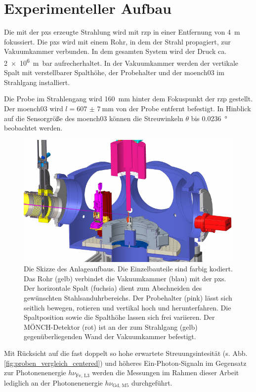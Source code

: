 \chapter{Experimenteller Aufbau}
Die mit der \gls{pxs} erzeugte Strahlung wird mit \gls{rzp} in einer Entfernung von \SI{4}{\meter} fokussiert. Die \gls{pxs} wird mit einem Rohr, in dem der Strahl propagiert, zur Vakuumkammer verbunden. In dem gesamten System wird der Druck ca. \SI{2e6}{\meter\bar} aufrecherhaltet. In der Vakuumkammer werden der vertikale Spalt mit verstellbarer Spalthöhe, der Probehalter und der \gls{moench03} im Strahlgang installiert.

\noindent
Die Probe im Strahlengang wird \SI{160}{\milli\meter} hinter dem Fokuspunkt der \gls{rzp} gestellt. Der \gls{moench03} wird $l = \SI{607(7)}{\milli\meter}$ von der Probe entfernt befestigt. In Hinblick auf die Sensorgröße  des \gls{moench03} können die Streuwinkeln $\theta$ bis \SI{0,0236}{\degree} beobachtet werden. 
\begin{figure}[H]
    \centering
    \includegraphics{images/aufbau/aufbau_empty.pdf}
    \caption{Die Skizze des Anlageaufbaus. Die Einzelbauteile sind farbig kodiert. Das Rohr (gelb) verbindet die Vakuumkammer (blau) mit der \gls{pxs}. Der horizontale Spalt (fuchsia) dient zum Abschneiden des gewünschten Stahlsanduhrbereichs. Der Probehalter (pink) lässt sich seitlich bewegen, rotieren und vertikal hoch und herunterfahren. Die Spaltposition sowie die Spalthöhe lassen sich frei variieren. Der MÖNCH-Detektor (rot) ist an der zum Strahlgang (gelb) gegenüberliegenden Wand der Vakuumkammer befestigt.}
    \label{fig:anlage}
\end{figure}
\noindent
Mit Rücksicht auf die fast doppelt so hohe erwartete Streuungsintesität (s. Abb. \ref{fig:proben_vergleich_centered}) und höheres Ein-Photon-Signaln im Gegensatz zur Photonenenergie $h\nu_\text{Fe, L3}$ werden die Messungen im Rahmen dieser Arbeit lediglich an der Photonenenergie $h\nu_\text{Gd, M5}$ durchgeführt.


